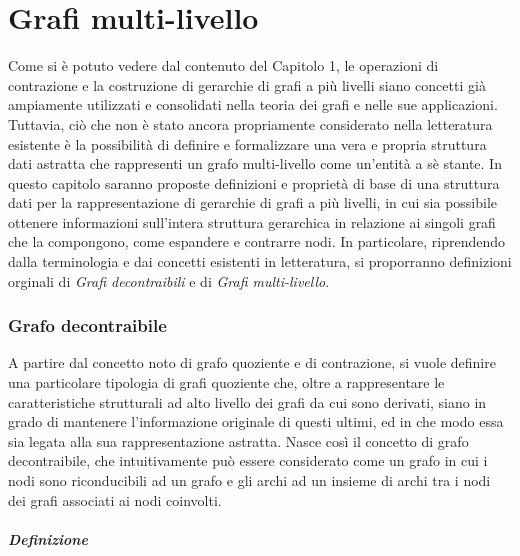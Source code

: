 \usepackage{drftcite}\chapter{Grafi multi-livello}

Come si \`e potuto vedere dal contenuto del Capitolo 1, le operazioni di contrazione e la costruzione di
gerarchie di grafi a pi\`u livelli siano concetti gi\`a ampiamente utilizzati e consolidati nella teoria dei grafi e
nelle sue applicazioni.
Tuttavia, ci\`o che non \`e stato ancora propriamente considerato nella letteratura esistente \`e la possibilit\`a di
definire e formalizzare una vera e propria struttura dati astratta che rappresenti un grafo multi-livello come
un'entit\`a a s\`e stante.
In questo capitolo saranno proposte definizioni e propriet\`a di base di una struttura dati per la rappresentazione
di gerarchie di grafi a pi\`u livelli, in cui sia possibile ottenere informazioni sull'intera struttura gerarchica in
relazione ai singoli grafi che la compongono, come espandere e contrarre nodi.
In particolare, riprendendo dalla terminologia e dai concetti esistenti in letteratura, si proporranno definizioni
orginali di \textit{Grafi decontraibili} e di \textit{Grafi multi-livello}.

\subsection{Grafo decontraibile}\label{subsec:grafo-decontraibile}

    A partire dal concetto noto di grafo quoziente e di contrazione, si vuole definire una particolare
    tipologia di grafi quoziente che, oltre a rappresentare le caratteristiche strutturali ad alto livello
    dei grafi da cui sono derivati, siano in grado di mantenere l’informazione originale di questi ultimi, ed in
    che modo essa sia legata alla sua rappresentazione astratta. \newline
    Nasce cos\`i il concetto di grafo decontraibile, che intuitivamente pu\`o essere considerato come un grafo
    in cui i nodi sono riconducibili ad un grafo e gli archi ad un insieme di archi tra i nodi dei grafi
    associati ai nodi coinvolti. \newline

    \paragraph{Definizione}

